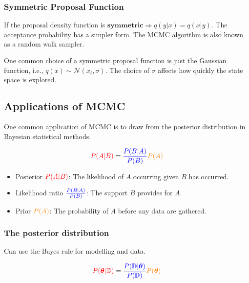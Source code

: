 \subsubsection{Symmetric Proposal Function}

\indent 

If the proposal density function is $\textbf{symmetric}\Rightarrow q(y|x) = q(x|y)$. The acceptance probability has a simpler form. The MCMC algorithm is also known as a random walk sampler.

One common choice of a symmetric proposal function is just the Gaussian function, i.e., $q(x)\sim \mathcal{N}(x_t,\sigma)$. The choice of $\sigma$ affects how quickly the state space is explored.

\subsection{Applications of MCMC}

\indent

One common application of MCMC is to draw from the posterior distribution in Bayesian statistical methods.

\begin{align*}
    \textcolor{red}{P(A|B)} = \textcolor{blue}{\frac{P(B|A)}{P(B)}}\textcolor{orange}{P(A)}
\end{align*}

\begin{itemize}
    \item Posterior $\textcolor{red}{P(A|B)}$: The likelihood of $A$ occurring given $B$ has occurred.
    \item Likelihood ratio $\textcolor{blue}{\frac{P(B|A)}{P(B)}}$: The support $B$ provides for $A$.
    \item Prior $\textcolor{orange}{P(A)}$: The probability of $A$ before any data are gathered.
\end{itemize}

\subsubsection{The posterior distribution}

\indent 

Can use the Bayes rule for modelling and data.

\begin{align*}
    \textcolor{red}{P(\boldsymbol{\theta}|\mathbb{D})} = \textcolor{blue}{\frac{P(\mathbb{D}|\boldsymbol{\theta})}{P(\mathbb{D})}}\textcolor{orange}{P(\boldsymbol{\theta})}
\end{align*}

